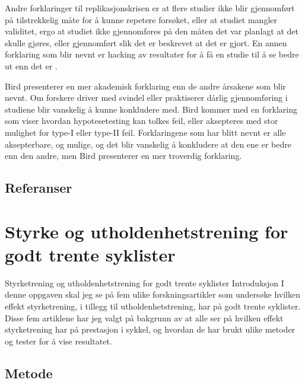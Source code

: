 \documentclass[
]{book}
\begin{document}
Andre forklaringer til replikasjonskrisen er at flere studier ikke blir gjennomført på tilstrekkelig måte for å kunne repetere forsøket, eller at studiet mangler validitet, ergo at studiet ikke gjennomføres på den måten det var planlagt at det skulle gjøres, eller gjennomført slik det er beskrevet at det er gjort. En annen forklaring som blir nevnt er hacking av resultater for å få en studie til å se bedre ut enn det er \citep{bird2020}.

Bird presenterer en mer akademisk forklaring enn de andre årsakene som blir nevnt. Om forskere driver med svindel eller praktiserer dårlig gjennomføring i studiene blir vanskelig å kunne konkludere med. Bird kommer med en forklaring som viser hvordan hypotesetesting kan tolkes feil, eller aksepteres med stor mulighet for type-I eller type-II feil. Forklaringene som har blitt nevnt er alle aksepterbare, og mulige, og det blir vanskelig å konkludere at den ene er bedre enn den andre, men Bird presenterer en mer troverdig forklaring.

\hypertarget{referanser-1}{%
\section{Referanser}\label{referanser-1}}

\hypertarget{styrke-og-utholdenhetstrening-for-godt-trente-syklister}{%
\chapter{Styrke og utholdenhetstrening for godt trente syklister}\label{styrke-og-utholdenhetstrening-for-godt-trente-syklister}}

Styrketrening og utholdenhetstrening for godt trente syklister Introduksjon I denne oppgaven skal jeg se på fem ulike forskningsartikler som undersøke hvilken effekt styrketrening, i tillegg til utholdenhetstrening, har på godt trente syklister. Disse fem artiklene har jeg valgt på bakgrunn av at alle ser på hvilken effekt styrketrening har på prestasjon i sykkel, og hvordan de har brukt ulike metoder og tester for å vise resultatet.

\hypertarget{metode-1}{%
\section{Metode}\label{metode-1}}
\end{document}
